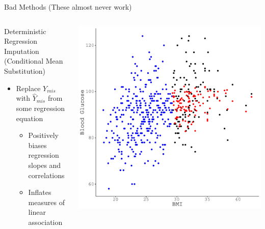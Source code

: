\documentclass{beamer}\usepackage[]{graphicx}\usepackage[]{color}
\makeatletter
\def\maxwidth{ %
  \ifdim\Gin@nat@width>\linewidth
    \linewidth
  \else
    \Gin@nat@width
  \fi
}
\newenvironment{knitrout}{}{} %
\makeatother
\begin{document}

\begin{frame}{Bad Methods (These almost never work)} 

  \begin{columns}
    \begin{column}{0.5\textwidth}
      
      Deterministic Regression Imputation\\
      (Conditional Mean Substitution)
      \begin{itemize}
      \item Replace $Y_{mis}$ with $\widehat{Y}_{mis}$ from some regression 
        equation
        \begin{itemize}
        \item Positively biases regression slopes and correlations
        \item Inflates measures of linear association
        \end{itemize}
      \end{itemize}
      
    \end{column}
    \begin{column}{0.5\textwidth}
      
\begin{knitrout}\footnotesize
{}\color{fgcolor}

{\centering \includegraphics[width=\maxwidth]{figure/intro-unnamed-chunk-24-1} 

}


\end{knitrout}

\end{column}
\end{columns}

\end{frame}
\end{document}
